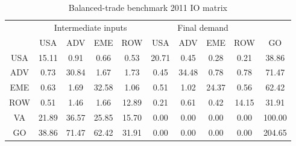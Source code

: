 \begin{table}[p]
\begin{center}
\caption{Balanced-trade benchmark 2011 IO matrix}
\label{tab:iomat-bal-bench-2011}
\small
\begin{tabular}{cccccccccc}
\toprule
& \multicolumn{4}{c}{Intermediate inputs}& \multicolumn{4}{c}{Final demand} & \\
\cmidrule(rl){2-5}\cmidrule(rl){6-9}
 &USA &ADV &EME &ROW &USA &ADV &EME &ROW& GO\\
\midrule
USA& 15.11& 0.91& 0.66& 0.53& 20.71& 0.45& 0.28& 0.21& 38.86 \\
ADV& 0.73& 30.84& 1.67& 1.73& 0.45& 34.48& 0.78& 0.78& 71.47 \\
EME& 0.63& 1.69& 32.58& 1.06& 0.51& 1.02& 24.37& 0.56& 62.42 \\
ROW& 0.51& 1.46& 1.66& 12.89& 0.21& 0.61& 0.42& 14.15& 31.91 \\
\midrule
VA& 21.89& 36.57& 25.85& 15.70& 0.00& 0.00& 0.00& 0.00& 100.00\\
\midrule
GO& 38.86& 71.47& 62.42& 31.91& 0.00& 0.00& 0.00& 0.00& 204.65\\
\bottomrule
\end{tabular}
\normalsize
\end{center}
\end{table}
